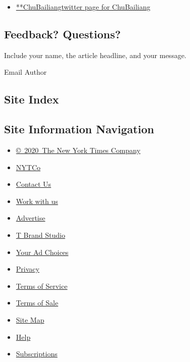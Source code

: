 \begin{itemize}
\tightlist
\item
  \href{https://twitter.com/ChuBailiang}{**ChuBailiangtwitter page for
  ChuBailiang}
\end{itemize}

\hypertarget{feedback-questions}{%
\subsection{Feedback? Questions?}\label{feedback-questions}}

Include your name, the article headline, and your message.

Email Author

\hypertarget{site-index}{%
\subsection{Site Index}\label{site-index}}

\hypertarget{site-information-navigation}{%
\subsection{Site Information
Navigation}\label{site-information-navigation}}

\begin{itemize}
\tightlist
\item
  \href{https://help.nytimes.com/hc/en-us/articles/115014792127-Copyright-notice}{©~2020~The
  New York Times Company}
\end{itemize}

\begin{itemize}
\tightlist
\item
  \href{https://www.nytco.com/}{NYTCo}
\item
  \href{https://help.nytimes.com/hc/en-us/articles/115015385887-Contact-Us}{Contact
  Us}
\item
  \href{https://www.nytco.com/careers/}{Work with us}
\item
  \href{https://nytmediakit.com/}{Advertise}
\item
  \href{http://www.tbrandstudio.com/}{T Brand Studio}
\item
  \href{https://www.nytimes.com/privacy/cookie-policy\#how-do-i-manage-trackers}{Your
  Ad Choices}
\item
  \href{https://www.nytimes.com/privacy}{Privacy}
\item
  \href{https://help.nytimes.com/hc/en-us/articles/115014893428-Terms-of-service}{Terms
  of Service}
\item
  \href{https://help.nytimes.com/hc/en-us/articles/115014893968-Terms-of-sale}{Terms
  of Sale}
\item
  \href{https://spiderbites.nytimes.com}{Site Map}
\item
  \href{https://help.nytimes.com/hc/en-us}{Help}
\item
  \href{https://www.nytimes.com/subscription?campaignId=37WXW}{Subscriptions}
\end{itemize}
